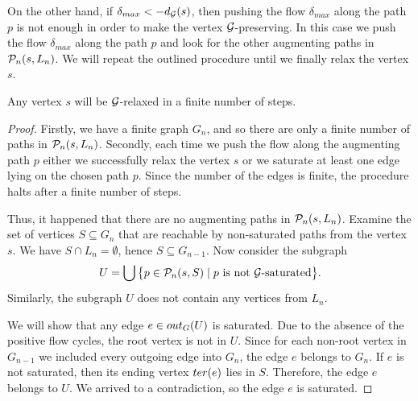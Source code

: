 \documentclass[12pt,oneside,a4paper]{amsart}
\begin{document}
        On the other hand, if $\delta_{max} < -d_{\cal{G}}(s)$, then pushing the flow $\delta_{max}$ along the path $p$ is not enough
          in order to make the vertex $\cal{G}$-preserving.
        In this case we push the flow $\delta_{max}$ along the path $p$ and look for the other augmenting paths in $\gnpaths(s, L_n)$.
        We will repeat the outlined procedure until we finally relax the vertex $s$.
        \begin{prop}
          Any vertex $s$ will be $\cal{G}$-relaxed in a finite number of steps.
        \end{prop}
        \begin{proof}
          Firstly, we have a finite graph $G_{n}$, and so there are only a finite number
            of paths in $\gnpaths(s, L_n)$.
          Secondly, each time we push the flow along the augmenting path $p$ either we successfully relax the vertex $s$
            or we saturate at least one edge lying on the chosen path $p$.
          Since the number of the edges is finite, the procedure halts after a finite number of steps.

          Thus, it happened that there are no augmenting paths in $\gnpaths(s, L_n)$.
          Examine the set of vertices $S \subseteq G_n$ that are reachable by non-saturated paths from the vertex $s$.
          We have $S \cap L_n = \emptyset$, hence $S \subseteq G_{n-1}$.
          Now consider the subgraph
            \[
              U = \bigcup\big\{p \in \gnpaths(s, S) \mid \text{$p$ is not $\cal{G}$-saturated}\big\}.
            \]
          Similarly, the subgraph $U$ does not contain any vertices from $L_n$.

          We will show that any edge $e \in \eout_G(U)$ is saturated.
          Due to the absence of the positive flow cycles, the root vertex is not in $U$.
          Since for each non-root vertex in $G_{n-1}$ we included every outgoing edge into $G_n$,
            the edge $e$ belongs to $G_n$.
          If $e$ is not saturated, then its ending vertex $\ter(e)$ lies in $S$.
          Therefore, the edge $e$ belongs to $U$.
          We arrived to a contradiction, so the edge $e$ is saturated.


\end{proof}
\end{document}

